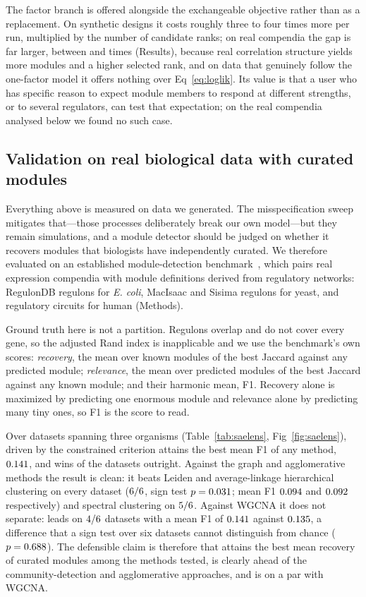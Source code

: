 The factor branch is offered alongside the exchangeable objective rather than as
a replacement. On synthetic designs it costs roughly three to four times more per
run, multiplied by the number of candidate ranks; on real compendia the gap is far
larger, between \SaelensCostRatioMin{} and \SaelensCostRatioMax{} times (Results), because real correlation
structure yields more modules and a higher selected rank, and on data that genuinely follow the one-factor
model it offers nothing over Eq~\eqref{eq:loglik}. Its value is that a user who
has specific reason to expect module members to respond at different strengths, or to several regulators, can test that expectation; on the real compendia analysed below we found no such case.

\subsection*{Validation on real biological data with curated modules}
Everything above is measured on data we generated. The misspecification sweep
mitigates that---those processes deliberately break our own model---but they
remain simulations, and a module detector should be judged on whether it recovers
modules that biologists have independently curated. We therefore evaluated on an established module-detection benchmark~\cite{Saelens2018}, which pairs real expression
compendia with module definitions derived from regulatory networks:
RegulonDB regulons for \emph{E. coli}, MacIsaac and Sisima regulons for yeast, and
regulatory circuits for human (Methods).

Ground truth here is not a partition. Regulons overlap and do not cover every
gene, so the adjusted Rand index is inapplicable and we use the benchmark's own
scores: \emph{recovery}, the mean over known modules of the best Jaccard against
any predicted module; \emph{relevance}, the mean over predicted modules of the
best Jaccard against any known module; and their harmonic mean, F1. Recovery
alone is maximized by predicting one enormous module and relevance alone by
predicting many tiny ones, so F1 is the score to read.

Over \SaelensNDatasets{} datasets spanning three organisms
(Table~\ref{tab:saelens}, Fig~\ref{fig:saelens}), \tool{} driven by the
constrained criterion attains the best mean F1 of any method,
$0.141{}$, and wins \SaelensLoglikWins{} of the \SaelensNDatasets{}
datasets outright. Against the graph and agglomerative methods the result is
clean: it beats Leiden and average-linkage hierarchical clustering on every
dataset ($6/6{}$, sign test $p=0.031{}$; mean F1
$0.094{}$ and $0.092{}$ respectively) and spectral clustering
on $5/6{}$. Against WGCNA it does not separate: \tool{} leads
on $4/6{}$ datasets with a mean F1 of $0.141{}$ against
$0.135{}$, a difference that a sign test over six datasets cannot
distinguish from chance ($p=0.688{}$). The defensible claim is therefore
that \tool{} attains the best mean recovery of curated modules among the methods
tested, is clearly ahead of the community-detection and agglomerative approaches,
and is on a par with WGCNA.

